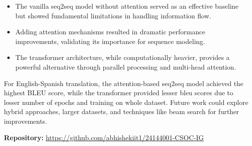 \documentclass[12pt]{article}
\begin{document}
\begin{itemize}
    \item The vanilla seq2seq model without attention served as an effective baseline but showed fundamental limitations in handling information flow.
    \item Adding attention mechanisms resulted in dramatic performance improvements, validating its importance for sequence modeling.
    \item The transformer architecture, while computationally heavier, provides a powerful alternative through parallel processing and multi-head attention.

\end{itemize}

For English-Spanish translation, the attention-based seq2seq model achieved the highest BLEU score, while the transformer provided lesser bleu scores due to lesser number of epochs and training on whole dataset. Future work could explore hybrid approaches, larger datasets, and techniques like beam search for further improvements.

\vspace{1em}
\noindent\textbf{Repository:} \href{https://github.com/abhishekiit1/24144001-CSOC-IG}{https://github.com/abhishekiit1/24144001-CSOC-IG}
\end{document}
